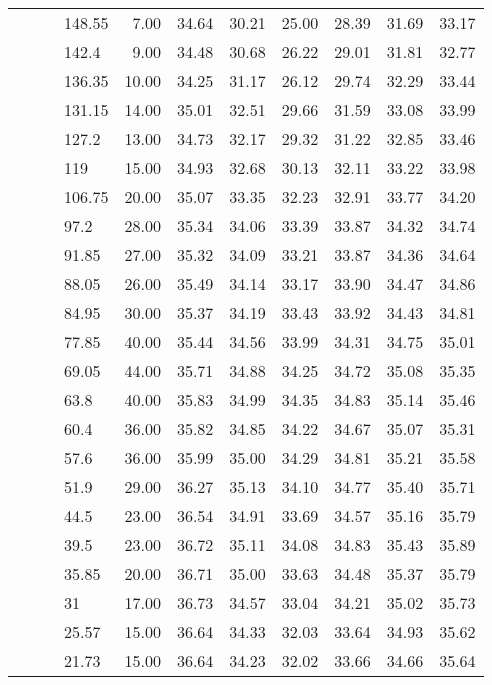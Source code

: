 \begin{longtable}{llllrrrrrrr}
   &  &  & 148.55 & 7.00 & 34.64 & 30.21 & 25.00 & 28.39 & 31.69 & 33.17 \\ 
   &  &  & 142.4 & 9.00 & 34.48 & 30.68 & 26.22 & 29.01 & 31.81 & 32.77 \\ 
   &  &  & 136.35 & 10.00 & 34.25 & 31.17 & 26.12 & 29.74 & 32.29 & 33.44 \\ 
   &  &  & 131.15 & 14.00 & 35.01 & 32.51 & 29.66 & 31.59 & 33.08 & 33.99 \\ 
   &  &  & 127.2 & 13.00 & 34.73 & 32.17 & 29.32 & 31.22 & 32.85 & 33.46 \\ 
   &  &  & 119 & 15.00 & 34.93 & 32.68 & 30.13 & 32.11 & 33.22 & 33.98 \\ 
   &  &  & 106.75 & 20.00 & 35.07 & 33.35 & 32.23 & 32.91 & 33.77 & 34.20 \\ 
   &  &  & 97.2 & 28.00 & 35.34 & 34.06 & 33.39 & 33.87 & 34.32 & 34.74 \\ 
   &  &  & 91.85 & 27.00 & 35.32 & 34.09 & 33.21 & 33.87 & 34.36 & 34.64 \\ 
   &  &  & 88.05 & 26.00 & 35.49 & 34.14 & 33.17 & 33.90 & 34.47 & 34.86 \\ 
   &  &  & 84.95 & 30.00 & 35.37 & 34.19 & 33.43 & 33.92 & 34.43 & 34.81 \\ 
   &  &  & 77.85 & 40.00 & 35.44 & 34.56 & 33.99 & 34.31 & 34.75 & 35.01 \\ 
   &  &  & 69.05 & 44.00 & 35.71 & 34.88 & 34.25 & 34.72 & 35.08 & 35.35 \\ 
   &  &  & 63.8 & 40.00 & 35.83 & 34.99 & 34.35 & 34.83 & 35.14 & 35.46 \\ 
   &  &  & 60.4 & 36.00 & 35.82 & 34.85 & 34.22 & 34.67 & 35.07 & 35.31 \\ 
   &  &  & 57.6 & 36.00 & 35.99 & 35.00 & 34.29 & 34.81 & 35.21 & 35.58 \\ 
   &  &  & 51.9 & 29.00 & 36.27 & 35.13 & 34.10 & 34.77 & 35.40 & 35.71 \\ 
   &  &  & 44.5 & 23.00 & 36.54 & 34.91 & 33.69 & 34.57 & 35.16 & 35.79 \\ 
   &  &  & 39.5 & 23.00 & 36.72 & 35.11 & 34.08 & 34.83 & 35.43 & 35.89 \\ 
   &  &  & 35.85 & 20.00 & 36.71 & 35.00 & 33.63 & 34.48 & 35.37 & 35.79 \\ 
   &  &  & 31 & 17.00 & 36.73 & 34.57 & 33.04 & 34.21 & 35.02 & 35.73 \\ 
   &  &  & 25.57 & 15.00 & 36.64 & 34.33 & 32.03 & 33.64 & 34.93 & 35.62 \\ 
   &  &  & 21.73 & 15.00 & 36.64 & 34.23 & 32.02 & 33.66 & 34.66 & 35.64 \\ 

\end{longtable}
